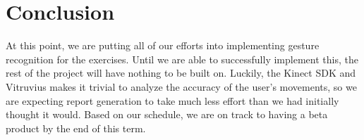\documentclass[onecolumn, draftclsnofoot,10pt, compsoc]{IEEEtran}
\begin{document}
\section{Conclusion}
At this point, we are putting all of our efforts into implementing gesture recognition for the exercises. Until we are able to successfully implement this, the rest of the project will have nothing to be built on. Luckily, the Kinect SDK and Vitruvius makes it trivial to analyze the accuracy of the user's movements, so we are expecting report generation to take much less effort than we had initially thought it would. Based on our schedule, we are on track to having a beta product by the end of this term.

\newpage


\end{document}
